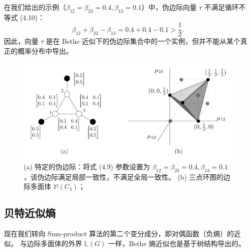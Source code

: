 \begin{tcolorbox}
\begin{exam}
在我们给出的示例（$\beta_{12} = \beta_{23} = 0.4, \beta_{13} = 0.1$）中，伪边际向量 $\tau$ 不满足循环不等式 (4.10)：
\begin{equation*}
    \beta_{12} + \beta_{23} - \beta_{13} = 0.4 + 0.4 - 0.1 > \frac{1}{2}.
\end{equation*}
因此，向量 $\tau$ 是在 Bethe 近似下的伪边际集合中的一个实例，但并不能从某个真正的概率分布中导出。

\end{exam}
\end{tcolorbox}

\begin{figure}[htbp]
    \centering
    \includegraphics[width=.9\linewidth]{figure/4-1.PNG}
    \caption{
        (a) 特定的伪边际：将式 (4.9) 参数设置为 $\beta_{12} = \beta_{23} = 0.4, \beta_{13} = 0.1$，该伪边际满足局部一致性，不满足全局一致性。
        (b) 三点环图的边际多面体 $\mathbb{M}(C_3)$；
    }\label{fig:4-1}
\end{figure}

\subsection{贝特近似熵}

现在我们转向 Sum-product 算法的第二个变分成分，即对偶函数（负熵）的近似。
与边际多面体的外界 $\mathbb{L}(G)$ 一样，Bethe 熵近似也是基于树结构导出的。


